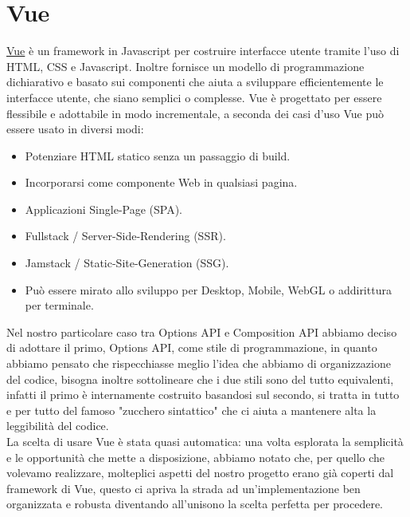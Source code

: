 \documentclass[a4paper,12pt]{report}
\newcommand{\vue}{\href{https://vuejs.org/}{Vue} }
\begin{document}
\section{Vue}
\vue è un framework in Javascript per costruire interfacce utente tramite l'uso di HTML, CSS e Javascript. Inoltre fornisce un modello di programmazione dichiarativo e basato sui componenti che aiuta a sviluppare efficientemente le interfacce utente, che siano semplici o complesse. Vue è progettato per essere flessibile e adottabile in modo incrementale, a seconda dei casi d'uso Vue può essere usato in diversi modi:
\begin{itemize}
    \item Potenziare HTML statico senza un passaggio di build.
    \item Incorporarsi come componente Web in qualsiasi pagina.
    \item Applicazioni Single-Page (SPA).
    \item Fullstack / Server-Side-Rendering (SSR).
    \item Jamstack / Static-Site-Generation (SSG).
    \item Può essere mirato allo sviluppo per Desktop, Mobile, WebGL o addirittura per terminale.
\end{itemize}
Nel nostro particolare caso tra Options API e Composition API abbiamo deciso di adottare il primo, Options API, come stile di programmazione, in quanto abbiamo pensato che rispecchiasse meglio l'idea che abbiamo di organizzazione del codice, bisogna inoltre sottolineare che i due stili sono del tutto equivalenti, infatti il primo è internamente costruito basandosi sul secondo, si tratta in tutto e per tutto del famoso "zucchero sintattico" che ci aiuta a mantenere alta la leggibilità del codice.\\
La scelta di usare Vue è stata quasi automatica: una volta esplorata la semplicità e le opportunità che mette a disposizione, abbiamo notato che, per quello che volevamo realizzare, molteplici aspetti del nostro progetto erano già coperti dal framework di Vue, questo ci apriva la strada ad un'implementazione ben organizzata e robusta diventando all'unisono la scelta perfetta per procedere.
\end{document}
